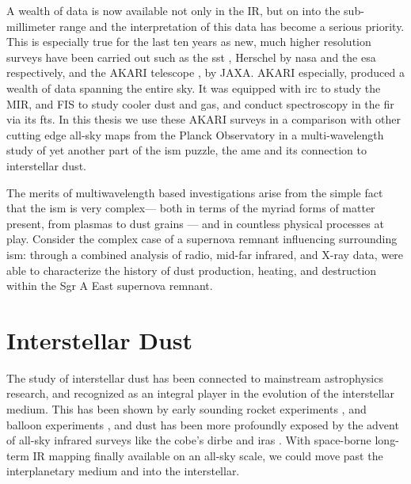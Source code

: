     A wealth of data is now available not only in the IR, but on into the sub-millimeter range and the interpretation of this data has become a serious priority. This is especially true for the last ten years as new, much higher resolution surveys have been carried out such as the \gls{sst} \cite{spitzer04}, \gls{Herschel} \citep{herschel10} by \gls{nasa} and the \gls{esa} respectively, and the AKARI telescope \citep{akari07},  by JAXA. AKARI especially, produced a wealth of data spanning the entire sky. It was equipped with \gls{irc} \citep{irc07} to study the MIR, and FIS \citep{fis07} to study cooler dust and gas, and conduct spectroscopy in the \gls{fir} via its \gls{fts}. In this thesis we use these AKARI surveys in a comparison with other cutting edge all-sky maps from the Planck Observatory in a multi-wavelength study of yet another part of the \gls{ism} puzzle, the \gls{ame} and its connection to interstellar dust.

    The merits of multiwavelength based investigations arise from the simple fact that the \gls{ism} is very complex--- both in terms of the myriad forms of matter present, from plasmas to dust grains --- and in countless physical processes at play. Consider the complex case of a supernova remnant influencing surrounding \gls{ism}: through a combined analysis of radio, mid-far infrared, and X-ray data, \cite{lau15} were able to characterize the history of dust production, heating, and destruction within the Sgr A East supernova remnant.


\section{Interstellar Dust}

    The study of interstellar dust has been connected to mainstream astrophysics research, and recognized as an integral player in the evolution of the interstellar medium. This has been shown by early sounding rocket experiments \citep{wolstencroft67,soifer71}, and balloon experiments \citep{muehlner70,emerson73}, and dust has been more profoundly exposed by the advent of all-sky infrared surveys like the \gls{cobe}'s \gls{dirbe} \citep{sodroski94} and \gls{iras} \citep{iras84}.
    With space-borne long-term IR mapping finally available on an all-sky scale, we could move past the interplanetary medium and into the interstellar.

